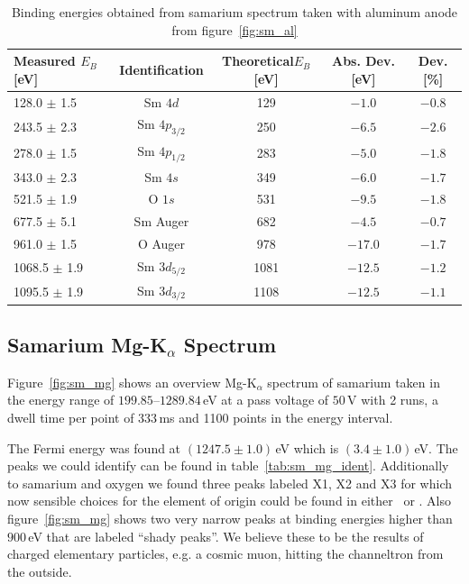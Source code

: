 \documentclass[a4paper,10pt]{scrartcl}
\begin{document}
\begin{table}[h]
\begin{center}
\begin{tabular}{lcccc}
\toprule
Measured $E_{B}$ [eV]      & Identification & Theoretical$E_{B}$ [eV] & Abs. Dev. [eV] & Dev. [\%]\\
\midrule
\phantom{0}128.0 $\pm$ 1.5 & Sm $4d$        & 129                     & $-1.0$         & $-0.8$\\
\phantom{0}243.5 $\pm$ 2.3 & Sm $4p_{3/2}$  & 250                     & $-6.5$         & $-2.6$\\
\phantom{0}278.0 $\pm$ 1.5 & Sm $4p_{1/2}$  & 283                     & $-5.0$         & $-1.8$\\
\phantom{0}343.0 $\pm$ 2.3 & Sm $4s$        & 349                     & $-6.0$         & $-1.7$\\
\phantom{0}521.5 $\pm$ 1.9 & O $1s$         & 531                     & $-9.5$         & $-1.8$\\
\phantom{0}677.5 $\pm$ 5.1 & Sm Auger       & 682                     & $-4.5$         & $-0.7$\\
\phantom{0}961.0 $\pm$ 1.5 & O Auger        & 978                     & $-17.0$        & $-1.7$\\
1068.5 $\pm$ 1.9           & Sm $3d_{5/2}$  & 1081                    & $-12.5$        & $-1.2$\\
1095.5 $\pm$ 1.9           & Sm $3d_{3/2}$  & 1108                    & $-12.5$        & $-1.1$\\
\bottomrule
\end{tabular}
\end{center}
\par
\caption{Binding energies obtained from samarium spectrum taken with aluminum anode from figure~\ref{fig:sm_al} \label{tab:sm_al_ident}}
\end{table}


\subsection*{Samarium Mg-K$_{\alpha}$ Spectrum}

Figure~\ref{fig:sm_mg} shows an overview Mg-K$_{\alpha}$ spectrum of samarium taken in the energy range of $199.85$--$1289.84\,$eV at a pass voltage of $50\,$V with 2 runs, a dwell time per point of $333\,$ms and 1100 points in the energy interval. 

The Fermi energy was found at $(1247.5 \pm 1.0)\,$eV which is $(3.4 \pm 1.0)\,$eV. The peaks we could identify can be found in table~\ref{tab:sm_mg_ident}. Additionally to samarium and oxygen we found three peaks labeled X1, X2 and X3 for which now sensible choices for the element of origin could be found in either~\cite{handbook} or \cite{nist}. Also figure~\ref{fig:sm_mg} shows two very narrow peaks at binding energies higher than $900\,$eV that are labeled ``shady peaks''. We believe these to be the results of charged elementary particles, e.g. a cosmic muon, hitting the channeltron from the outside.
\end{document}

